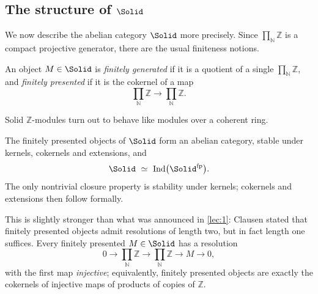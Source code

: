 \subsection{The structure of \texorpdfstring{$\Solid$}{Solid}}

We now describe the abelian category $\Solid$ more precisely. Since
$\prod_{\mathbb{N}}\mathbb{Z}$ is a compact projective generator, there are the
usual finiteness notions.

\begin{definition}
\label{def:6:fg-fp}
An object $M\in\Solid$ is \emph{finitely generated} if it is a quotient of a
single $\prod_{\mathbb{N}}\mathbb{Z}$, and \emph{finitely presented} if it is the
cokernel of a map
\begin{equation}
\label{eq:6:fp}
\prod_{\mathbb{N}}\mathbb{Z}\longrightarrow\prod_{\mathbb{N}}\mathbb{Z}.
\end{equation}
\end{definition}

Solid $\mathbb{Z}$-modules turn out to behave like modules over a coherent ring.

\begin{theorem}
\label{thm:6:fp-abelian}
The finitely presented objects of $\Solid$ form an abelian category, stable under
kernels, cokernels and extensions, and
\begin{equation*}
\Solid\ \simeq\ \mathrm{Ind}\bigl(\Solid^{\mathrm{fp}}\bigr).
\end{equation*}
The only nontrivial closure property is stability under kernels; cokernels and
extensions then follow formally.
\end{theorem}

\begin{remark}
\label{rmk:6:length-one}
This is slightly stronger than what was announced in \cref{lec:1}: Clausen stated
that finitely presented objects admit resolutions of length two, but in fact
length one suffices. Every finitely presented $M\in\Solid$ has a resolution
\begin{equation}
\label{eq:6:fp-resolution}
0\longrightarrow\prod_{\mathbb{N}}\mathbb{Z}\longrightarrow\prod_{\mathbb{N}}\mathbb{Z}
\longrightarrow M\longrightarrow0,
\end{equation}
with the first map \emph{injective}; equivalently, finitely presented objects are
exactly the cokernels of injective maps of products of copies of $\mathbb{Z}$.
\end{remark}

